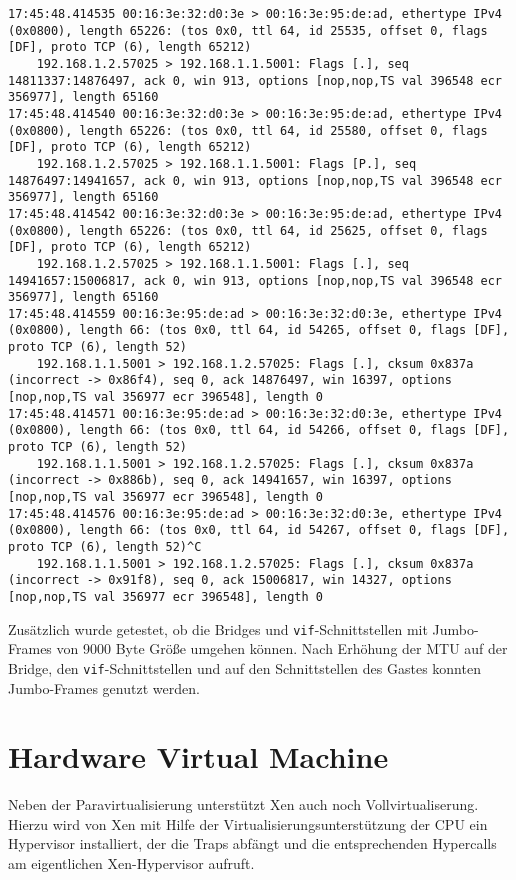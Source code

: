 \begin{verbatim}
17:45:48.414535 00:16:3e:32:d0:3e > 00:16:3e:95:de:ad, ethertype IPv4 (0x0800), length 65226: (tos 0x0, ttl 64, id 25535, offset 0, flags [DF], proto TCP (6), length 65212)
    192.168.1.2.57025 > 192.168.1.1.5001: Flags [.], seq 14811337:14876497, ack 0, win 913, options [nop,nop,TS val 396548 ecr 356977], length 65160
17:45:48.414540 00:16:3e:32:d0:3e > 00:16:3e:95:de:ad, ethertype IPv4 (0x0800), length 65226: (tos 0x0, ttl 64, id 25580, offset 0, flags [DF], proto TCP (6), length 65212)
    192.168.1.2.57025 > 192.168.1.1.5001: Flags [P.], seq 14876497:14941657, ack 0, win 913, options [nop,nop,TS val 396548 ecr 356977], length 65160
17:45:48.414542 00:16:3e:32:d0:3e > 00:16:3e:95:de:ad, ethertype IPv4 (0x0800), length 65226: (tos 0x0, ttl 64, id 25625, offset 0, flags [DF], proto TCP (6), length 65212)
    192.168.1.2.57025 > 192.168.1.1.5001: Flags [.], seq 14941657:15006817, ack 0, win 913, options [nop,nop,TS val 396548 ecr 356977], length 65160
17:45:48.414559 00:16:3e:95:de:ad > 00:16:3e:32:d0:3e, ethertype IPv4 (0x0800), length 66: (tos 0x0, ttl 64, id 54265, offset 0, flags [DF], proto TCP (6), length 52)
    192.168.1.1.5001 > 192.168.1.2.57025: Flags [.], cksum 0x837a (incorrect -> 0x86f4), seq 0, ack 14876497, win 16397, options [nop,nop,TS val 356977 ecr 396548], length 0
17:45:48.414571 00:16:3e:95:de:ad > 00:16:3e:32:d0:3e, ethertype IPv4 (0x0800), length 66: (tos 0x0, ttl 64, id 54266, offset 0, flags [DF], proto TCP (6), length 52)
    192.168.1.1.5001 > 192.168.1.2.57025: Flags [.], cksum 0x837a (incorrect -> 0x886b), seq 0, ack 14941657, win 16397, options [nop,nop,TS val 356977 ecr 396548], length 0
17:45:48.414576 00:16:3e:95:de:ad > 00:16:3e:32:d0:3e, ethertype IPv4 (0x0800), length 66: (tos 0x0, ttl 64, id 54267, offset 0, flags [DF], proto TCP (6), length 52)^C
    192.168.1.1.5001 > 192.168.1.2.57025: Flags [.], cksum 0x837a (incorrect -> 0x91f8), seq 0, ack 15006817, win 14327, options [nop,nop,TS val 356977 ecr 396548], length 0
\end{verbatim}
Zusätzlich wurde getestet, ob die Bridges und \verb#vif#-Schnittstellen mit Jumbo-Frames von 9000 Byte Größe umgehen können. Nach Erhöhung der MTU auf der Bridge, den \verb#vif#-Schnittstellen und auf den Schnittstellen des Gastes konnten Jumbo-Frames genutzt werden.

\section{Hardware Virtual Machine}
\label{hvm_vm}
Neben der Paravirtualisierung unterstützt Xen auch noch Vollvirtualiserung. Hierzu wird von Xen mit Hilfe der Virtualisierungsunterstützung der CPU ein Hypervisor installiert, der die Traps abfängt und die entsprechenden Hypercalls am eigentlichen Xen-Hypervisor aufruft.


